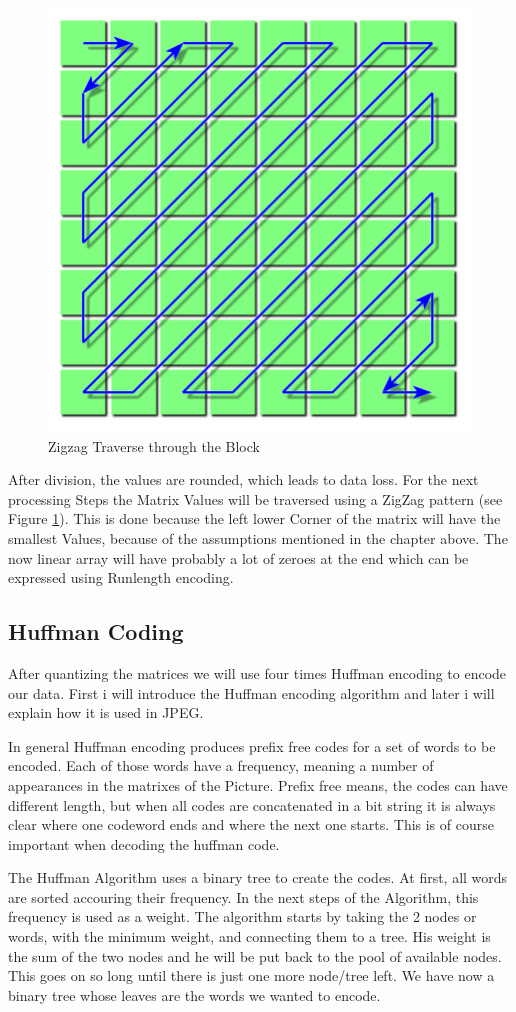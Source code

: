 \documentclass{scrartcl}
\begin{document}
\begin{figure}
\centering
\includegraphics[width=0.5\linewidth]{./JPEG_ZigZag}
\caption{Zigzag Traverse through the Block}
\label{fig:JPEG_ZigZag}
\end{figure}

After division, the values are rounded, which leads to data loss. For the next processing Steps the Matrix Values will be traversed using a ZigZag pattern (see Figure \ref{fig:JPEG_ZigZag}). This is done because the left lower Corner of the matrix will have the smallest Values, because of the assumptions mentioned in the chapter above. The now linear array will have probably a lot of zeroes at the end which can be expressed using Runlength encoding.

\subsection{Huffman Coding}
After quantizing the matrices we will use four times Huffman encoding to encode our data. First i will introduce the Huffman encoding algorithm and later i will explain how it is used in JPEG.

In general Huffman encoding produces prefix free codes for a set of words to be encoded. Each of those words have a frequency, meaning a number of appearances in the matrixes of the Picture. Prefix free means, the codes can have different length, but when all codes are concatenated in a bit string it is always clear where one codeword ends and where the next one starts. This is of course important when decoding the huffman code.

The Huffman Algorithm uses a binary tree to create the codes. At first, all words are sorted accouring their frequency. In the next steps of the Algorithm, this frequency is used as a weight. The algorithm starts by taking the 2 nodes or words, with the minimum weight, and connecting them to a tree. His weight is the sum of the two nodes and he will be put back to the pool of available nodes. This goes on so long until there is just one more node/tree left. We have now a binary tree whose leaves are the words we wanted to encode.
\end{document}
